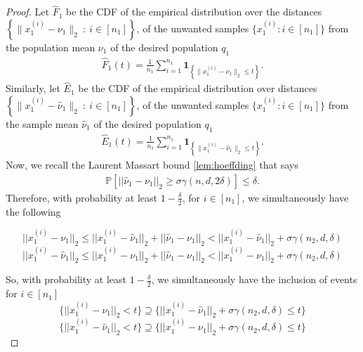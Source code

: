 \begin{proof}
Let $\widehat{F}_1$ be the CDF of the empirical distribution over the distances $\left \{ \|x_1^{(i)} - \nu_1\|_2 ~\colon~ i \in [n_1] \right\}$, of the unwanted samples $\{x_1^{(i)}: i\in [n_1]\}$ from the population mean $\nu_1$ of the desired population $q_1$ 
\begin{align}
    \widehat{F}_1(t) = \frac{1}{n_1} \sum_{i=1}^{n_1} \mathbf{1}_{\left\{ \|x_1^{(i)} - \nu_1\|_2 \leq t \right\}}.
\end{align}
Similarly, let $\widehat{E}_1$ be the CDF of the empirical distribution over distances $\left \{ \|x_1^{(i)} - \hat{\nu}_1\|_2 ~\colon~ i \in [n_1] \right\}$, of the unwanted samples $\{x_1^{(i)}: i\in [n_1]\}$ from the sample mean $\hat{\nu}_1$ of the desired population $q_1$ 
\begin{align}
    \widehat{E}_1(t) = \frac{1}{n_1} \sum_{i=1}^{n_1} \mathbf{1}_{\left\{ \|x_1^{(i)} - \hat{\nu}_1\|_2 \leq t \right\}}.
\end{align}
Now, we recall the Laurent Massart bound \ref{lem:hoeffding} that  says 
\begin{align}
     \mathbb{P}[||\hat{\nu}_1 - \nu_1||_2 \geq \sigma \gamma(n, d, 2\delta)] \leq  \delta .
\end{align}
Therefore, with probability at least $1-\frac{\delta}{2}$, for $i\in [n_1]$, we simultaneously have the following

\begin{equation}
||x_1^{(i)} - \nu_1||_2 
\leq 
||x_1^{(i)} - \hat{\nu}_1||_2
+
||\hat{\nu}_1 - \nu_1||_2
< 
||x_1^{(i)} - \hat{\nu}_1||_2 
+
\sigma  \gamma(n_2, d, \delta)
\end{equation}
\begin{equation}
||x_1^{(i)} - \hat{\nu}_1||_2 
\leq 
||x_1^{(i)} - \nu_1||_2
+
||\hat{\nu}_1 - \nu_1||_2
<
||x_1^{(i)} - \nu_1||_2 
+
\sigma  \gamma(n_2, d, \delta)
\end{equation}

So, with probability at least $1-\frac{\delta}{2}$,  we simultaneously have the inclusion of events for $i\in [n_1]$
\begin{equation} 
    \{||x_1^{(i)} - \nu_1||_2  < t\} \supseteq 
    \{||x_1^{(i)} - \hat{\nu}_1||_2 + \sigma  \gamma(n_2, d, \delta) \leq t\}
\end{equation}
\begin{equation}
    \{||x_1^{(i)} - \hat{\nu}_1||_2  < t\} \supseteq \{||x_1^{(i)} - \nu_1||_2 + \sigma  \gamma(n_2, d, \delta) \leq t\}
\end{equation}


\end{proof}
